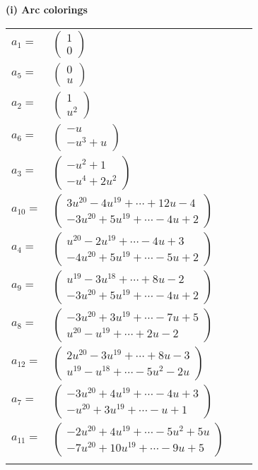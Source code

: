 \documentclass[1p]{elsarticle_modified}
\theoremstyle{definition}
\begin{document}
\flushleft \textbf{(i) Arc colorings}\\
\begin{tabular}{m{7pt} m{180pt} m{7pt} m{180pt} }
\flushright $a_{1}=$&$\begin{pmatrix}1\\0\end{pmatrix}$ \\
\flushright $a_{5}=$&$\begin{pmatrix}0\\u\end{pmatrix}$ \\
\flushright $a_{2}=$&$\begin{pmatrix}1\\u^2\end{pmatrix}$ \\
\flushright $a_{6}=$&$\begin{pmatrix}- u\\- u^3+u\end{pmatrix}$ \\
\flushright $a_{3}=$&$\begin{pmatrix}- u^2+1\\- u^4+2 u^2\end{pmatrix}$ \\
\flushright $a_{10}=$&$\begin{pmatrix}3 u^{20}-4 u^{19}+\cdots+12 u-4\\-3 u^{20}+5 u^{19}+\cdots-4 u+2\end{pmatrix}$ \\
\flushright $a_{4}=$&$\begin{pmatrix}u^{20}-2 u^{19}+\cdots-4 u+3\\-4 u^{20}+5 u^{19}+\cdots-5 u+2\end{pmatrix}$ \\
\flushright $a_{9}=$&$\begin{pmatrix}u^{19}-3 u^{18}+\cdots+8 u-2\\-3 u^{20}+5 u^{19}+\cdots-4 u+2\end{pmatrix}$ \\
\flushright $a_{8}=$&$\begin{pmatrix}-3 u^{20}+3 u^{19}+\cdots-7 u+5\\u^{20}- u^{19}+\cdots+2 u-2\end{pmatrix}$ \\
\flushright $a_{12}=$&$\begin{pmatrix}2 u^{20}-3 u^{19}+\cdots+8 u-3\\u^{19}- u^{18}+\cdots-5 u^2-2 u\end{pmatrix}$ \\
\flushright $a_{7}=$&$\begin{pmatrix}-3 u^{20}+4 u^{19}+\cdots-4 u+3\\- u^{20}+3 u^{19}+\cdots- u+1\end{pmatrix}$ \\
\flushright $a_{11}=$&$\begin{pmatrix}-2 u^{20}+4 u^{19}+\cdots-5 u^2+5 u\\-7 u^{20}+10 u^{19}+\cdots-9 u+5\end{pmatrix}$\\&\end{tabular}
\end{document}
